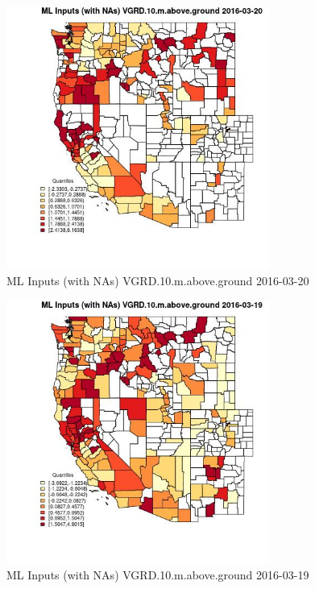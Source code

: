 \begin{figure} 
\centering  
\includegraphics[width=0.77\textwidth]{Code_Outputs/Report_ML_input_PM25_Step4_part_e_de_duplicated_aveswNAs_CountyVGRD10mabovegroundMean2016-03-20_2016-03-20.jpg} 
\caption{\label{fig:Report_ML_input_PM25_Step4_part_e_de_duplicated_aveswNAsCountyVGRD10mabovegroundMean2016-03-20_2016-03-20}ML Inputs (with NAs) VGRD.10.m.above.ground 2016-03-20} 
\end{figure} 
 

\begin{figure} 
\centering  
\includegraphics[width=0.77\textwidth]{Code_Outputs/Report_ML_input_PM25_Step4_part_e_de_duplicated_aveswNAs_CountyVGRD10mabovegroundMean2016-03-19_2016-03-19.jpg} 
\caption{\label{fig:Report_ML_input_PM25_Step4_part_e_de_duplicated_aveswNAsCountyVGRD10mabovegroundMean2016-03-19_2016-03-19}ML Inputs (with NAs) VGRD.10.m.above.ground 2016-03-19} 
\end{figure} 
 

